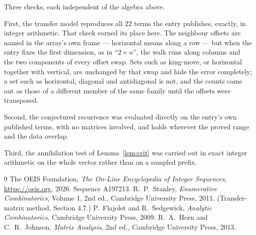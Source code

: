\documentclass[11pt,a4paper]{article}
\theoremstyle{plain}
\theoremstyle{definition}
\begin{document}
Three checks, each independent of the algebra above.

First, the transfer model reproduces all $22$ terms the entry publishes, exactly, in
integer arithmetic. That check earned its place here. The neighbour offsets are named in the
array's own frame --- horizontal means along a row --- but when the entry fixes the first
dimension, as in ``$2\times n$'', the walk runs along columns and the two components of every
offset swap. Sets such as king-move, or horizontal together with vertical, are unchanged by
that swap and hide the error completely; a set such as horizontal, diagonal and antidiagonal
is not, and the counts came out as those of a different member of the same family until the
offsets were transposed.

Second, the conjectured recurrence was evaluated directly on the entry's own published terms,
with no matrices involved, and holds wherever the proved range and the data overlap.

Third, the annihilation test of Lemma~\ref{lem:crit} was carried out in exact integer
arithmetic on the whole vector rather than on a sampled prefix.

\begin{thebibliography}{9}
 The OEIS Foundation, \emph{The On-Line Encyclopedia of Integer
Sequences}, \url{https://oeis.org}, 2026. Sequence A197213.
 R.~P.~Stanley, \emph{Enumerative Combinatorics}, Volume 1, 2nd ed.,
Cambridge University Press, 2011. (Transfer-matrix method, Section 4.7.)
 P.~Flajolet and R.~Sedgewick, \emph{Analytic Combinatorics}, Cambridge
University Press, 2009.
 R.~A.~Horn and C.~R.~Johnson, \emph{Matrix Analysis}, 2nd ed., Cambridge
University Press, 2013.
\end{thebibliography}
\end{document}
